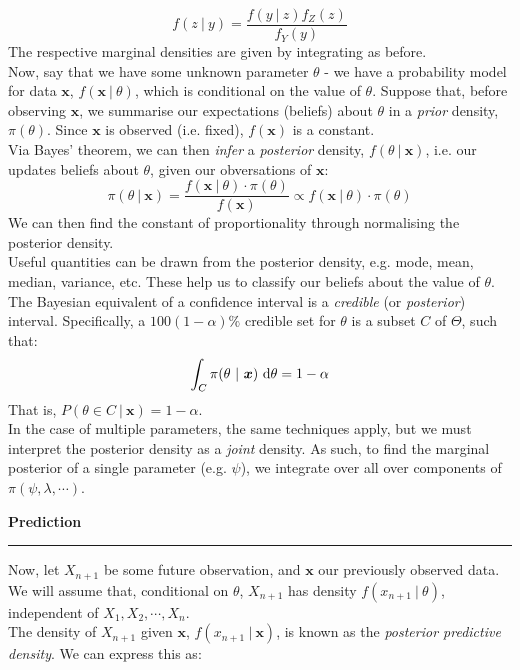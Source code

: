 \documentclass[12pt]{article}
\newcommand{\minisection}[1]{
    \par\vspace{0.25cm}
    \textbf{#1}\par
    \vspace{0.1cm}
    \hrule
    \vspace{0.25cm}
}
\begin{document}
    \begin{equation*}
        f(z\ |\ y) = \frac{f(y\ |\ z)f_Z(z)}{f_Y(y)}
    \end{equation*}
    The respective marginal densities are given by integrating as before.\\
    Now, say that we have some unknown parameter $\theta$ - we have a probability model for data $\bm x$, $f(\bm x\ |\ \theta)$, which is conditional on the value of $\theta$. Suppose that, before observing $\bm x$, we summarise our expectations (beliefs) about $\theta$ in a \textit{prior} density, $\pi(\theta)$. Since $\bm x$ is observed (i.e. fixed), $f(\bm x)$ is a constant.\\
    Via Bayes' theorem, we can then \textit{infer} a \textit{posterior} density, $f( \theta\ |\ \bm x)$, i.e. our updates beliefs about $\theta$, given our obversations of $\bm x$:
    \begin{equation*}
        \pi(\theta\ |\ \bm x) = \frac{f(\bm x\ |\ \theta)\cdot\pi(\theta)}{f(\bm x)} \propto f(\bm x\ |\ \theta)\cdot\pi(\theta)
    \end{equation*}
    We can then find the constant of proportionality through normalising the posterior density.\\
    Useful quantities can be drawn from the posterior density, e.g. mode, mean, median, variance, etc. These help us to classify our beliefs about the value of $\theta$.\\
    The Bayesian equivalent of a confidence interval is a \textit{credible} (or \textit{posterior}) interval. Specifically, a $100(1-\alpha)\%$ credible set for $\theta$ is a subset $C$ of $\Theta$, such that:
    \begin{equation*}
        \int_C \pi(\theta\ |\ \bm x)\ \text d\theta = 1-\alpha
    \end{equation*}
    That is, $P(\theta\in C\ |\ \bm x)=1-\alpha$.\\
    In the case of multiple parameters, the same techniques apply, but we must interpret the posterior density as a \textit{joint} density. As such, to find the marginal posterior of a single parameter (e.g. $\psi$), we integrate over all over components of $\pi(\psi,\lambda,\cdots)$.
    \minisection{Prediction}
    Now, let $X_{n+1}$ be some future observation, and $\bm x$ our previously observed data. We will assume that, conditional on $\theta$, $X_{n+1}$ has density $f(x_{n+1}\ |\ \theta)$, independent of $X_1,X_2,\cdots,X_n$.\\
    The density of $X_{n+1}$ given $\bm x$, $f(x_{n+1}\ |\ \bm x)$, is known as the \textit{posterior predictive density}. We can express this as:
\end{document}
